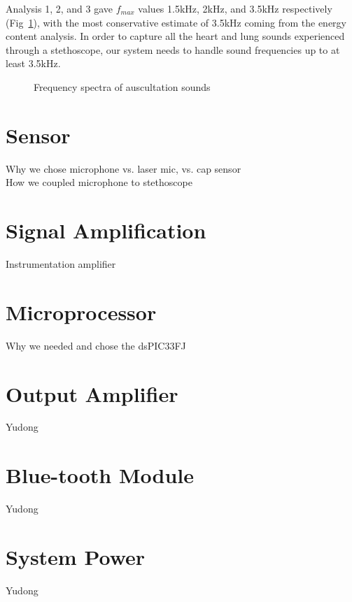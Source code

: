 Analysis 1, 2, and 3 gave $f_{max}$ values 1.5kHz, 2kHz, and 3.5kHz respectively (Fig~\ref{fig:ausc_spectra}), with the most conservative estimate of 3.5kHz coming from the energy content analysis. In order to capture all the heart and lung sounds experienced through a stethoscope, our system needs to handle sound frequencies up to at least 3.5kHz. 

\begin{figure}[htbp]
	\centering
	\caption{Frequency spectra of auscultation sounds}
	\label{fig:ausc_spectra}
\end{figure}


\section{Sensor}
Why we chose microphone vs. laser mic, vs. cap sensor \\
How we coupled microphone to stethoscope

\section{Signal Amplification}
Instrumentation amplifier

\section{Microprocessor}
Why we needed and chose the dsPIC33FJ

\section{Output Amplifier}
Yudong

\section{Blue-tooth Module}
Yudong

\section{System Power}
Yudong